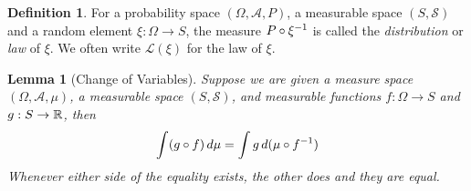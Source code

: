 \documentclass{amsart}
\newtheorem{lem}[thm]{Lemma}
\theoremstyle{remark}
\theoremstyle{definition}
\newtheorem{defn}[thm]{Definition}
\begin{document}
\begin{defn}For a probability space $(\Omega, \mathcal{A}, P)$, a
  measurable space $(S, \mathcal{S})$ and a
  random element $\xi : \Omega \to S$, the measure $P \circ \xi^{-1}$ is
  called the \emph{distribution} or \emph{law} of $\xi$.  We often
  write $\mathcal{L}(\xi)$ for the law of $\xi$.
\end{defn}
\begin{lem}[Change of Variables]\label{ChangeOfVariables}Suppose we are given a measure space $(\Omega, \mathcal{A},
  \mu)$, a measurable space $(S, \mathcal{S})$, and measurable
  functions $f : \Omega \to S$ and $g : S \to \mathbb{R}$, then 
\begin{align*}
\int (g \circ f) \, d \mu = \int g \, d (\mu \circ f^{-1})
\end{align*}
Whenever either side of the equality exists, the other does and they
are equal.
\end{lem}
\end{document}
